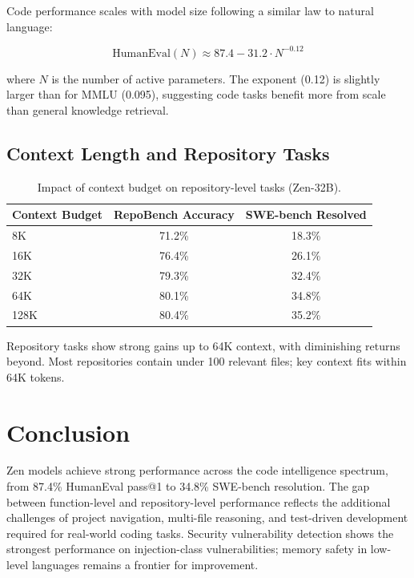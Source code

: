 \documentclass[11pt,a4paper]{article}
\begin{document}
Code performance scales with model size following a similar law to natural language:

\begin{equation}
\text{HumanEval}(N) \approx 87.4 - 31.2 \cdot N^{-0.12}
\end{equation}

where $N$ is the number of active parameters. The exponent (0.12) is slightly larger
than for MMLU (0.095), suggesting code tasks benefit more from scale than general
knowledge retrieval.

\subsection{Context Length and Repository Tasks}

\begin{table}[H]
\centering
\begin{tabular}{lcc}
\toprule
\textbf{Context Budget} & \textbf{RepoBench Accuracy} & \textbf{SWE-bench Resolved} \\
\midrule
8K & 71.2\% & 18.3\% \\
16K & 76.4\% & 26.1\% \\
32K & 79.3\% & 32.4\% \\
64K & 80.1\% & 34.8\% \\
128K & 80.4\% & 35.2\% \\
\bottomrule
\end{tabular}
\caption{Impact of context budget on repository-level tasks (Zen-32B).}
\end{table}

Repository tasks show strong gains up to 64K context, with diminishing returns beyond.
Most repositories contain under 100 relevant files; key context fits within 64K tokens.

\section{Conclusion}

Zen models achieve strong performance across the code intelligence spectrum, from
87.4\% HumanEval pass@1 to 34.8\% SWE-bench resolution. The gap between function-level
and repository-level performance reflects the additional challenges of project
navigation, multi-file reasoning, and test-driven development required for real-world
coding tasks. Security vulnerability detection shows the strongest performance on
injection-class vulnerabilities; memory safety in low-level languages remains a
frontier for improvement.
\end{document}
